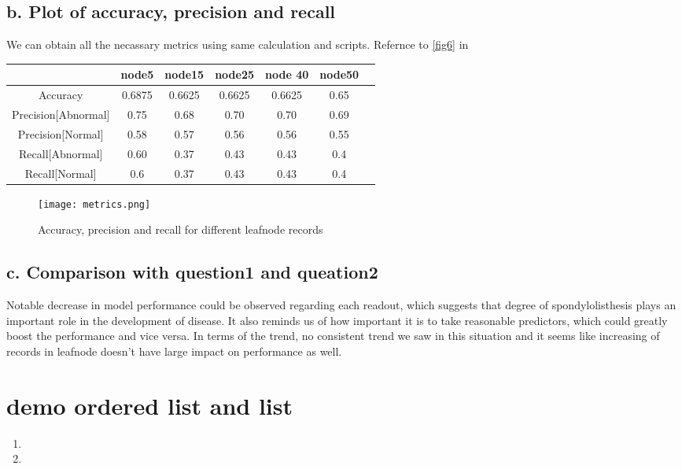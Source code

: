 \documentclass{article}
\begin{document}
\subsection*{b. Plot of accuracy, precision and recall}
We can obtain all the necassary metrics using same calculation and scripts. Refernce to \autoref{fig6} in \pageref{fig6}
\begin{center}
    \begin{tabular}{|c|c|c|c|c|c|c|}
    \hline
     & node5 & node15 & node25 &node 40 & node50 \\
    \hline
    Accuracy & 0.6875 & 0.6625 & 0.6625 & 0.6625 & 0.65\\
    \hline
    Precision[Abnormal] & 0.75 & 0.68 & 0.70 & 0.70 & 0.69\\
    \hline
    Precision[Normal] & 0.58 & 0.57 & 0.56 & 0.56 & 0.55\\
    \hline
    Recall[Abnormal] & 0.60 & 0.37 & 0.43 & 0.43 & 0.4\\
    \hline
    Recall[Normal] & 0.6&0.37&0.43&0.43&0.4\\
    \hline
    \end{tabular}
\end{center}
\begin{figure}[H]
    \centering
    \texttt{[image: metrics.png]}
    \caption{Accuracy, precision and recall for different leafnode records}
    \label{fig6}
\end{figure}
\subsection*{c. Comparison with question1 and queation2}
Notable decrease in model performance could be observed regarding each readout, which suggests that degree of spondylolisthesis plays an important role in the development of disease. It also reminds us of how important it is to take reasonable predictors, which could greatly boost the performance and vice versa. In terms of the trend, no consistent trend we saw in this situation and it seems like increasing of records in leafnode doesn't have large impact on performance as well.

\section{demo ordered list and list}
\begin{enumerate}
	\item 
	\item
\end{enumerate}
\end{document}
